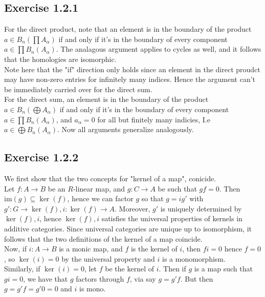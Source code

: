 \documentclass{article}
\theoremstyle{definition}
\newcommand{\im}{\text{im}}
\begin{document}
\subsection*{Exercise 1.2.1}

For the direct product, note that an element is in the boundary of the product
$a \in B_n\left(\prod A_{\alpha}\right)$ if and only if it's in the boundary of
every component $a \in \prod B_n\left(A_{\alpha}\right)$. The analagous argument
applies to cycles as well, and it follows that the homologies are isomorphic.
\\

Note here that the "if" direction only holds since an element in the direct
proudct may have non-zero entries for infinitely many indices. Hence the
argument can't be immediately carried over for the direct sum. \\

For the direct sum, an element is in the boundary of the product $a \in
B_n\left(\bigoplus A_{\alpha}\right)$ if and only if it's in the boundary of
every component $a \in \prod B_n\left(A_{\alpha}\right)$, and $a_{\alpha} = 0$
for all but finitely many indicies, I.e $a \in \bigoplus
B_n\left(A_{\alpha}\right)$. Now all arguments generalize analogously.

\subsection*{Exercise 1.2.2}

We first show that the two concepts for "kernel of a map", conicide. \\

Let $f : A \to B$ be an $R$-linear map, and $g : C \to A$ be such that $gf =
0$. Then $\im(g) \subseteq \ker(f)$, hence we can factor $g$ so that $g = i g'$
with $g' : G \to \ker(f), i : \ker(f) \to A$. Moreover, $g'$ is uniquely
determined by $\ker(f), i$, hence $\ker(f), i$ satisfies the universal properties
of kernels in additive categories. Since universal categories are unique up to
isomorphism, it follows that the two definitions of the kernel of a map
coincide. \\

Now, if $i : A \to B$ is a monic map, and $f$ is the kernel of $i$, then $fi =
0$ hence $f = 0$, so $\ker(i) = 0$ by the universal property and $i$ is a
monomorphism. \\

Similarly, if $\ker(i) = 0$, let $f$ be the kernel of $i$. Then if $g$ is a map
such that $gi = 0$, we have that $g$ factors through $f$, via say $g = g'f$.
But then $g = g'f = g'0 = 0$ and $i$ is mono. \\
\end{document}
